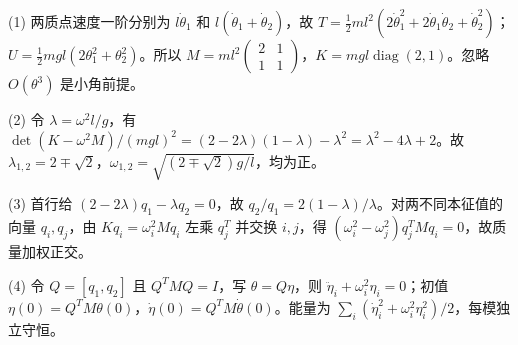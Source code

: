 (1) 两质点速度一阶分别为 $l\dot\theta_1$ 和 $l(\dot\theta_1+\dot\theta_2)$，故 $T=\frac12 ml^2(2\dot\theta_1^2+2\dot\theta_1\dot\theta_2+\dot\theta_2^2)$；$U=\frac12mgl(2\theta_1^2+\theta_2^2)$。所以 $M=ml^2\begin{pmatrix}2&1\\1&1\end{pmatrix}$，$K=mgl\operatorname{diag}(2,1)$。忽略 $O(\theta^3)$ 是小角前提。

(2) 令 $\lambda=\omega^2l/g$，有 $\det(K-\omega^2M)/(mgl)^2=(2-2\lambda)(1-\lambda)-\lambda^2=\lambda^2-4\lambda+2$。故 $\lambda_{1,2}=2\mp\sqrt2$，$\omega_{1,2}=\sqrt{(2\mp\sqrt2)g/l}$，均为正。

(3) 首行给 $(2-2\lambda)q_1-\lambda q_2=0$，故 $q_2/q_1=2(1-\lambda)/\lambda$。对两不同本征值的向量 $q_i,q_j$，由 $Kq_i=\omega_i^2Mq_i$ 左乘 $q_j^T$ 并交换 $i,j$，得 $(\omega_i^2-\omega_j^2)q_j^TMq_i=0$，故质量加权正交。

(4) 令 $Q=[q_1,q_2]$ 且 $Q^TMQ=I$，写 $\theta=Q\eta$，则 $\ddot\eta_i+\omega_i^2\eta_i=0$；初值 $\eta(0)=Q^TM\theta(0)$，$\dot\eta(0)=Q^TM\dot\theta(0)$。能量为 $\sum_i(\dot\eta_i^2+\omega_i^2\eta_i^2)/2$，每模独立守恒。
